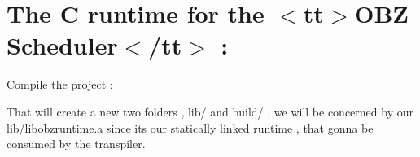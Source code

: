 \chapter{The C runtime for the \texorpdfstring{$<$}{<}tt\texorpdfstring{$>$}{>}OBZ Scheduler\texorpdfstring{$<$}{<}/tt\texorpdfstring{$>$}{>} \+:}
\hypertarget{md_include_2README}{}\label{md_include_2README}
\label{md_include_2README_autotoc_md0}%
%



\begin{DoxyEnumerate}
\item Compile the project \+:
\end{DoxyEnumerate}


\begin{DoxyCode}{0}

\end{DoxyCode}


That will create a new two folders , {\ttfamily lib/} and {\ttfamily build/} , we will be concerned by our {\ttfamily lib/libobzruntime.\+a} since it\textquotesingle{}s our statically linked runtime , that gonna be consumed by the transpiler. 
